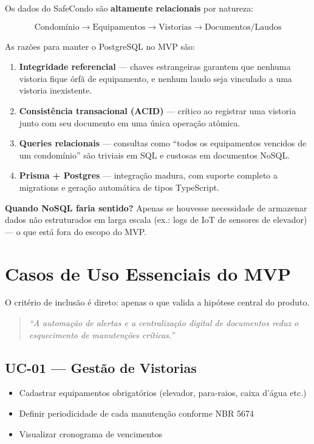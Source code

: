 \documentclass[12pt, a4paper]{article}
\begin{document}
Os dados do SafeCondo são \textbf{altamente relacionais} por natureza:

\[
\text{Condomínio} \rightarrow \text{Equipamentos} \rightarrow \text{Vistorias} \rightarrow \text{Documentos/Laudos}
\]

As razões para manter o PostgreSQL no MVP são:

\begin{enumerate}[leftmargin=1.5em]
    \item \textbf{Integridade referencial} — chaves estrangeiras garantem que nenhuma vistoria
    fique órfã de equipamento, e nenhum laudo seja vinculado a uma vistoria inexistente.
    \item \textbf{Consistência transacional (ACID)} — crítico ao registrar uma vistoria junto
    com seu documento em uma única operação atômica.
    \item \textbf{Queries relacionais} — consultas como ``todos os equipamentos vencidos de um
    condomínio'' são triviais em SQL e custosas em documentos NoSQL.
    \item \textbf{Prisma + Postgres} — integração madura, com suporte completo a migrations e
    geração automática de tipos TypeScript.
\end{enumerate}

\textbf{Quando NoSQL faria sentido?} Apenas se houvesse necessidade de armazenar dados
não estruturados em larga escala (ex.: logs de IoT de sensores de elevador) — o que está
fora do escopo do MVP.

\vspace{0.5cm}

\section{Casos de Uso Essenciais do MVP}

O critério de inclusão é direto: apenas o que valida a hipótese central do produto.

\begin{quote}
\textit{``A automação de alertas e a centralização digital de documentos reduz
o esquecimento de manutenções críticas.''}
\end{quote}

\subsection{UC-01 — Gestão de Vistorias}

\begin{itemize}[leftmargin=1.5em]
    \item Cadastrar equipamentos obrigatórios (elevador, para-raios, caixa d'água etc.)
    \item Definir periodicidade de cada manutenção conforme NBR 5674
    \item Visualizar cronograma de vencimentos
\end{itemize}
\end{document}
